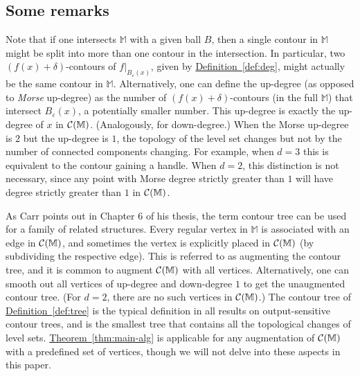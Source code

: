 \documentclass[11pt]{article}
\theoremstyle{definition}
\newcommand{\cC}{{\cal C}}
\newcommand{\MM}{\mathbb{M}}
\newcommand{\eps}{\varepsilon}
\newcommand{\Thm}[1]{\hyperref[thm:#1]{Theorem~\ref*{thm:#1}}} %
\newcommand{\Def}[1]{\hyperref[def:#1]{Definition~\ref*{def:#1}}} %
\newcommand{\reeb}{\cC}
\begin{document}

\subsection{Some remarks}
Note that if one intersects $\MM$ with a given ball $B$, then a single contour in $\MM$ might be split into more than one contour in the intersection. 
In particular, two $(f(x)+\delta)$-contours of $f|_{B_\eps(x)}$, given by \Def{deg}, might actually be the same contour in $\MM$. 
Alternatively, one can define the up-degree (as opposed to \emph{Morse} up-degree) as the number of $(f(x)+\delta)$-contours (in the full $\MM$)
that intersect $B_\eps(x)$, a potentially smaller number. This up-degree
is exactly the up-degree of $x$ in $\reeb(\MM)$. (Analogously, for down-degree.)
When the Morse up-degree is $2$ but the up-degree is $1$, the topology of the level set changes but not by the number of connected components changing.
For example, when $d=3$ this is equivalent to the contour gaining a handle.
When $d=2$, this distinction is not necessary, since any point with Morse degree strictly greater than $1$ will have degree strictly greater than $1$ in $\reeb(\MM)$.

As Carr points out in Chapter 6 of his thesis, the term contour tree can be used for a family of related structures.
Every regular vertex in $\MM$ is associated with an edge in $\reeb(\MM)$, and sometimes the
vertex is explicitly placed in $\reeb(\MM)$ (by subdividing the respective edge). This is referred
to as augmenting the contour tree, and it is common to augment $\reeb(\MM)$ with all vertices.
Alternatively, one can smooth out all vertices of up-degree and down-degree $1$ to get the
unaugmented contour tree. (For $d=2$, there are no such vertices in $\reeb(\MM)$.) 
The contour tree of \Def{tree} is the typical definition in all results on output-sensitive
contour trees, and is the smallest tree that contains all the topological changes
of level sets. \Thm{main-alg} is applicable for any augmentation of $\reeb(\MM)$ with a predefined
set of vertices, though we will not delve into these aspects in this paper.


\end{document}
